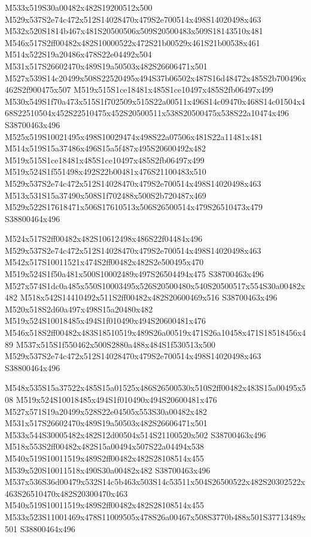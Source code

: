 \documentclass{article}
\begin{document}
\begin{multicols}{2}
M533x519S30a00482x482S19200512x500 M529x537S2e74c472x512S14028470x479S2e700514x498S14020498x463 M532x520S1814b467x481S20500506x509S20500483x509S18143510x481 M546x517S2ff00482x482S10000522x472S21b00529x461S21b00538x461 M514x522S19a20486x478S22e04492x504 M531x517S26602470x489S19a50503x482S26606471x501 M527x539S14c20499x508S22520495x494S37b06502x487S16d48472x485S2b700496x462S2f900475x507 M519x515S1ce18481x485S1ce10497x485S2fb06497x499 M530x549S1f70a473x515S1f702509x515S22a00511x496S14c09470x468S14c01504x468S22510504x452S22510475x452S20500511x538S20500475x538S22a10474x496 S38700463x496 M525x519S10021495x498S10029474x498S22a07506x481S22a11481x481 M514x519S15a37486x496S15a5f487x495S20600492x482 M519x515S1ce18481x485S1ce10497x485S2fb06497x499 M519x524S1f551498x492S22b00481x476S21100483x510 M529x537S2e74c472x512S14028470x479S2e700514x498S14020498x463 M513x531S15a37490x508S1f702488x500S2b720487x469 M529x522S17618471x506S17610513x506S26500514x479S26510473x479 S38800464x496

M524x517S2ff00482x482S10612498x486S22f04484x496 M529x537S2e74c472x512S14028470x479S2e700514x498S14020498x463 M542x517S10011521x474S2ff00482x482S2e500495x470 M519x524S1f50a481x500S10002489x497S26504494x475 S38700463x496 M527x574S1dc0a485x550S10003495x526S20500480x540S20500517x554S30a00482x482 M518x542S14410492x511S2ff00482x482S20600469x516 S38700463x496 M520x518S2d60a497x498S15a20480x482 M519x524S10018485x494S1f010490x494S20600481x476 M546x518S2ff00482x483S18510519x489S26a00519x471S26a10458x471S18518456x489 M537x515S1f550462x500S2880a488x484S1f530513x500 M529x537S2e74c472x512S14028470x479S2e700514x498S14020498x463 S38800464x496

M548x535S15a37522x485S15a01525x486S26500530x510S2ff00482x483S15a00495x508 M519x524S10018485x494S1f010490x494S20600481x476 M527x571S19a20499x528S22e04505x553S30a00482x482 M531x517S26602470x489S19a50503x482S26606471x501 M533x544S30005482x482S12d00504x514S21100520x502 S38700463x496 M518x553S2ff00482x482S15a00494x507S22a04494x538 M540x519S10011519x489S2ff00482x482S28108514x455 M539x520S10011518x490S30a00482x482 S38700463x496 M537x536S36d00479x532S14c5b463x503S14c53511x504S26500522x482S20302522x463S26510470x482S20300470x463 M540x519S10011519x489S2ff00482x482S28108514x455 M533x523S11001469x478S11009505x478S26a00467x508S3770b488x501S37713489x501 S38800464x496


\end{multicols}
\end{document}
